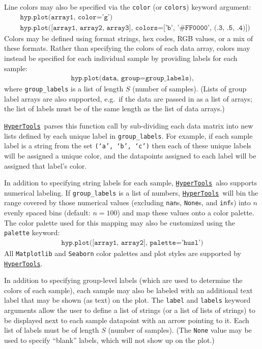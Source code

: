 \documentclass[12pt,letterpaper]{article}
\newcommand{\hypertools}{\href{https://github.com/ContextLab/hypertools}{\texttt{HyperTools}}}
\newcounter{example}
\begin{document}
Line colors may also be specified via the \texttt{color} (or \texttt{colors}) keyword argument:
\begin{align}
& \texttt{hyp.plot(array1, color='g')} \\
& \texttt{hyp.plot([array1, array2, array3], colors=['b', '\#FF0000', (.3, .5, .4)])}
\end{align}
Colors may be defined using format strings, hex codes, RGB values, or a mix of these formats. Rather than specifying the colors of each data array, colors may instead be specified for each individual sample by providing labels for each sample:
\begin{align}
\texttt{hyp.plot(data, group=group\_labels)},
\end{align}
where \texttt{group\_labels} is a list of length $S$ (number of samples).  (Lists of group label arrays are also supported, e.g.\ if the data are passed in as a list of arrays; the list of labels must be of the same length as the list of data arrays.)

\hypertools~parses this function call by sub-dividing each data matrix into new lists defined by each unique label in \texttt{group\_labels}.  For example, if each sample label is a string from the set \texttt{(`a', `b', `c')} then each of these unique labels will be assigned a unique color, and the datapoints assigned to each label will be assigned that label's color.

In addition to specifying string labels for each sample, \hypertools~also supports numerical labeling.  If \texttt{group\_labels} is a list of numbers, \hypertools~will bin the range covered by those numerical values (excluding \texttt{nan}s, \texttt{None}s, and \texttt{inf}s) into $n$ evenly spaced bins (default: $n = 100$) and map these values onto a color palette.  The color palette used for this mapping may also be customized using the \texttt{palette} keyword:
\begin{align}
\texttt{hyp.plot([array1, array2], palette='husl')}
\end{align}
All \texttt{Matplotlib} and \texttt{Seaborn} color palettes and plot styles are supported by \hypertools.

In addition to specifying group-level labels (which are used to determine the colors of each sample), each sample may also be labeled with an additional text label that may be shown (as text) on the plot.  The \texttt{label} and \texttt{labels} keyword arguments allow the user to define a list of strings (or a list of lists of strings) to be displayed next to each sample datapoint with an arrow pointing to it.  Each list of labels must be of length $S$ (number of samples).  (The \texttt{None} value may be used to specify ``blank'' labels, which will not show up on the plot.)
\end{document}
